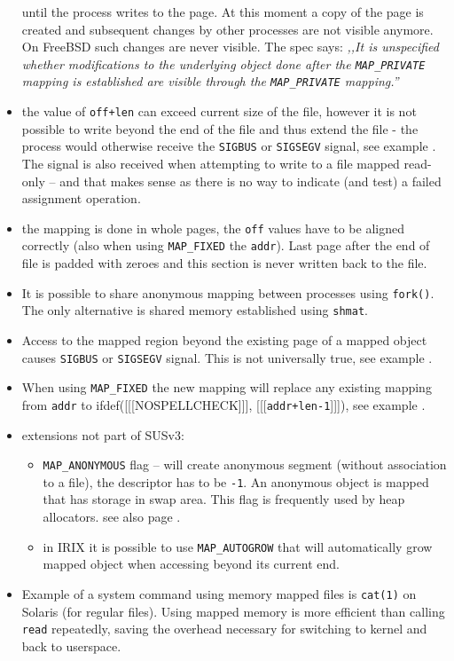 \begin{itemize}
until the process writes to the page. At this moment a copy of the page is
created and subsequent changes by other processes are not visible anymore.
On FreeBSD such changes are never visible.  The spec says:
\emph{,,It is unspecified whether modifications to the underlying object done
after the \texttt{MAP\_PRIVATE} mapping is established are visible through the
\texttt{MAP\_PRIVATE} mapping.''}
\item the value of \texttt{off+l{}en} can exceed current size of the file,
however it is not possible to write beyond the end of the file and thus
extend the file - the process would otherwise receive the \texttt{SIGBUS} or
\texttt{SIGSEGV} signal, see example .
The signal is also received when attempting to write to a file mapped read-only
-- and that makes sense as there is no way to indicate (and test) a failed
assignment operation.
\item the mapping is done in whole pages, the \texttt{off} values have to
be aligned correctly (also when using \texttt{MAP\_FIXED} the \texttt{addr}).
Last page after the end of file is padded with zeroes and this section is
never written back to the file.
\item It is possible to share anonymous mapping between processes using
\texttt{fork()}. The only alternative is shared memory established using
\texttt{shmat}.
\item Access to the mapped region beyond the existing page of a mapped object
causes \texttt{SIGBUS} or \texttt{SIGSEGV} signal.
This is not universally true, see example .
\item When using \texttt{MAP\_FIXED} the new mapping will replace any existing
mapping from \texttt{addr} to
ifdef([[[NOSPELLCHECK]]], [[[\texttt{addr+l{}en-1}]]]), see example
.
\item extensions not part of SUSv3:
    \begin{itemize}
    \setlength{\itemsep}{0.8\itemsep}
    \item \texttt{MAP\_ANONYMOUS} flag -- will create anonymous segment
    (without association to a file), the descriptor has to be \texttt{-1}.
    An anonymous object is mapped that has storage in swap area.
    This flag is frequently used by heap allocators.
    see also page \pageref{SOLARIS_PROC_ADDR_SPACE}.
    \item in IRIX it is possible to use \texttt{MAP\_AUTOGROW} that will
    automatically grow mapped object when accessing beyond its current end.
    \end{itemize}
\item Example of a system command using memory mapped files is \texttt{cat(1)}
on Solaris (for regular files). Using mapped memory is more efficient than
calling \texttt{read} repeatedly, saving the overhead necessary for switching to
kernel and back to userspace.
\end{itemize}

